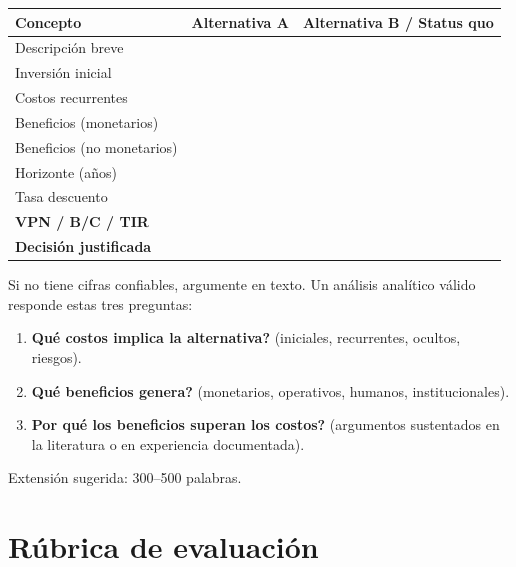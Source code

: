 \documentclass[11pt, a4paper]{article}
\begin{document}
\begin{center}
\begin{tabularx}{\textwidth}{@{}lXX@{}}
\toprule
\textbf{Concepto} & \textbf{Alternativa A} & \textbf{Alternativa B / Status quo}\\
\midrule
Descripci\'on breve & \rule{0pt}{1.2em}\hrulefill & \rule{0pt}{1.2em}\hrulefill\\[6pt]
Inversi\'on inicial & \hrulefill & \hrulefill\\[6pt]
Costos recurrentes & \hrulefill & \hrulefill\\[6pt]
Beneficios (monetarios) & \hrulefill & \hrulefill\\[6pt]
Beneficios (no monetarios) & \hrulefill & \hrulefill\\[6pt]
Horizonte (a\~nos) & \hrulefill & \hrulefill\\[6pt]
Tasa descuento & \hrulefill & \hrulefill\\[6pt]
\textbf{VPN / B/C / TIR} & \hrulefill & \hrulefill\\[6pt]
\textbf{Decisi\'on justificada} & \multicolumn{2}{p{0.6\textwidth}}{\rule{0pt}{1.2em}\hrulefill}\\[6pt]
\bottomrule
\end{tabularx}
\end{center}

\begin{cajaInfo}
Si no tiene cifras confiables, argumente en texto. Un an\'alisis anal\'itico v\'alido responde estas tres preguntas:
\begin{enumerate}[leftmargin=1.5em]
\item \textbf{\textquestiondown Qu\'e costos implica la alternativa?} (iniciales, recurrentes, ocultos, riesgos).
\item \textbf{\textquestiondown Qu\'e beneficios genera?} (monetarios, operativos, humanos, institucionales).
\item \textbf{\textquestiondown Por qu\'e los beneficios superan los costos?} (argumentos sustentados en la literatura o en experiencia documentada).
\end{enumerate}
Extensi\'on sugerida: 300--500 palabras.
\end{cajaInfo}

\newpage

\section{R\'ubrica de evaluaci\'on}
\end{document}

